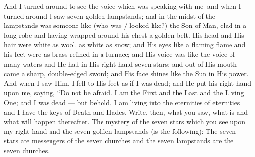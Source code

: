 \begin{pages}
\begin{Leftside}
		\pend
		\pstart
			And I turned around to see the voice which was speaking with me, and when I turned around I saw seven golden lampstands; and in the midst of the lampstands was someone like (who was / looked like?) the Son of Man, clad in a long robe and having wrapped around his chest a golden belt. His head and His hair were white as wool, as white as snow; and His eyes like a flaming flame and his feet were as brass refined in a furnace; and His voice was like the voice of many waters and He had in His right hand seven stars; and out of His mouth came a sharp, double-edged sword; and His face shines like the Sun in His power.
		\pend
		\pstart
			And when I saw Him, I fell to His feet as if I was dead; and He put his right hand upon me, saying, “Do not be afraid. I am the First and the Last and the Living One; and I was dead — but behold, I am living into the eternities of eternities and I have the keys of Death and Hades. Write, then, what you saw, what is and what will happen thereafter. The mystery of the seven stars which you see upon my right hand and the seven golden lampstands (is the following): The seven stars are messengers of the seven churches and the seven lampstands are the seven churches.
		\pend
        \endnumbering
    \end{Leftside}

\end{pages} 
\Pages